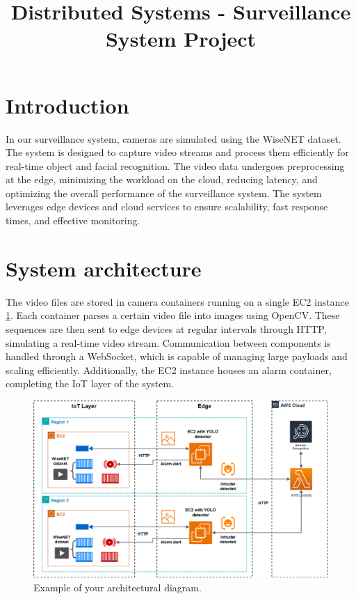 \documentclass[conference]{IEEEtran}
\begin{document}
\title{Distributed Systems - Surveillance System Project}

\author{
\and 
{}
\and
{}
}

\maketitle

\section{Introduction}
In our surveillance system, cameras are simulated using the WiseNET dataset. The system is designed to capture video streams and process them efficiently for real-time object and facial recognition. The video data undergoes preprocessing at the edge, minimizing the workload on the cloud, reducing latency, and optimizing the overall performance of the surveillance system. The system leverages edge devices and cloud services to ensure scalability, fast response times, and effective monitoring.  

\section{System architecture}
The video files are stored in camera containers running on a single EC2 instance \ref{fig:architecture}. Each container parses a certain video file into images using OpenCV. These sequences are then sent to edge devices at regular intervals through HTTP, simulating a real-time video stream. Communication between components is handled through a WebSocket, which is capable of managing large payloads and scaling efficiently. Additionally, the EC2 instance houses an alarm container, completing the IoT layer of the system.

\begin{figure}[h!]
    \centering
    \includegraphics[width=1\linewidth]{DS_architecture_version2.png}
    \caption{Example of your architectural diagram.}
    \label{fig:architecture}
\end{figure}
\end{document}
